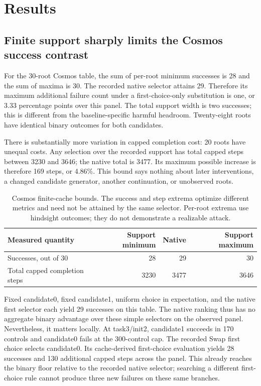 \documentclass[11pt]{article}
\begin{document}
\section{Results}
\label{sec:results}
\subsection{Finite support sharply limits the Cosmos success contrast}
For the 30-root Cosmos table, the sum of per-root minimum successes is 28 and
the sum of maxima is 30. The recorded native selector attains 29. Therefore
its maximum additional failure count under a first-choice-only substitution
is one, or 3.33 percentage points over this panel. The total support width is
two successes; this is different from the baseline-specific harmful headroom.
Twenty-eight roots have identical binary outcomes for both candidates.

There is substantially more variation in capped completion cost: 20 roots
have unequal costs. Any selection over the recorded support has total capped
steps between 3230 and 3646; the native total is 3477. Its maximum possible
increase is therefore 169 steps, or 4.86\%. This bound says nothing about
later interventions, a changed candidate generator, another continuation,
or unobserved roots.

\begin{table}[t]
\centering
\begin{tabular}{lrrr}
\toprule
Measured quantity & Support minimum & Native & Support maximum\\
\midrule
Successes, out of 30 & 28 & 29 & 30\\
Total capped completion steps & 3230 & 3477 & 3646\\
\bottomrule
\end{tabular}
\caption{Cosmos finite-cache bounds. The success and step extrema optimize
different metrics and need not be attained by the same selector. Per-root
extrema use hindsight outcomes; they do not demonstrate a realizable attack.}
\label{tab:cosmos-bounds}
\end{table}

Fixed candidate0, fixed candidate1, uniform choice in expectation, and the
native first selector each yield 29 successes on this table. The native
ranking thus has no aggregate binary advantage over these simple selectors
on the observed panel. Nevertheless, it matters locally. At task3/init2,
candidate1 succeeds in 170 controls and candidate0 fails at the 300-control
cap. The recorded Swap first choice selects candidate0. Its cache-derived
first-choice evaluation yields 28 successes and 130 additional capped steps
across the panel. This already reaches the binary floor relative to the
recorded native selector; searching a different first-choice rule cannot
produce three new failures on these same branches.
\end{document}
